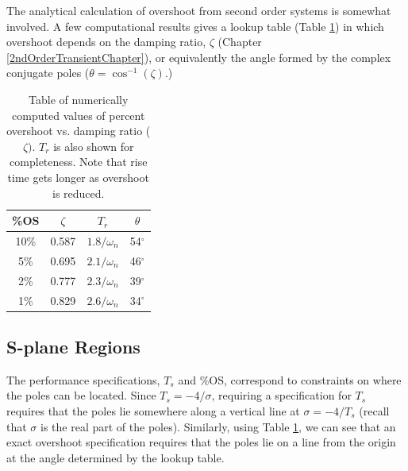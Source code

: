 The analytical calculation of overshoot from second order systems is somewhat involved.  A few computational results gives a lookup table (Table \ref{percentOStable}) in which overshoot depends on the damping ratio, $\zeta$ (Chapter \ref{2ndOrderTransientChapter}), or
equivalently the angle formed by the complex conjugate poles ($\theta = \cos^{-1}(\zeta)$.)

\begin{table}[h]\centering
\begin{tabular}{c|c|c|c}
	\%OS	& $\zeta$	& $T_r$          &   $\theta$	\\\hline
	10\%	& 0.587		& $1.8/\omega_n$ &  54$^\circ$	\\
	 5\%	& 0.695		& $2.1/\omega_n$ &  46$^\circ$	\\
	 2\%	& 0.777		& $2.3/\omega_n$ &  39$^\circ$	\\
	 1\%	& 0.829		& $2.6/\omega_n$ &  34$^\circ$	\\
\end{tabular}
\caption{Table of numerically computed values of percent overshoot vs. damping ratio ($\zeta)$.    $T_r$ is also shown for
completeness. Note that rise time gets longer as overshoot is reduced.}\label{percentOStable}
\end{table}

\subsection{S-plane Regions}

The performance specifications, $T_s$ and \%OS,  correspond to constraints on where the poles can be located.
Since  $T_s = -4/\sigma$, requiring a  specification for $T_s$ requires that the poles lie somewhere along a vertical line at $\sigma = -4/T_s$ (recall that $\sigma$ is the real part of the poles).  Similarly, using  Table \ref{percentOStable}, we can see that an exact overshoot specification requires that the poles lie on a line from the origin at the angle determined by the lookup table.


